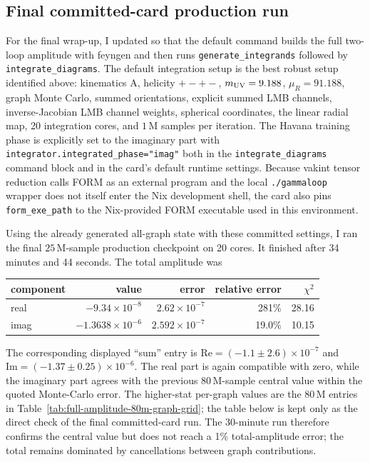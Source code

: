 \documentclass[11pt]{article}
\begin{document}
\subsection{Final committed-card production run}

For the final wrap-up, I updated
 so that the default command builds the
full two-loop amplitude with feyngen and then runs
\texttt{generate\_integrands} followed by \texttt{integrate\_diagrams}.  The
default integration setup is the best robust setup identified above:
kinematics A, helicity \(+-+-\), \(m_{\rm UV}=9.188\),
\(\mu_R=91.188\), graph Monte Carlo, summed orientations, explicit summed LMB
channels, inverse-Jacobian LMB channel weights, spherical coordinates, the
linear radial map, 20 integration cores, and \(1\,\mathrm{M}\) samples per
iteration.  The Havana training phase is explicitly set to the imaginary part
with \texttt{integrator.integrated\_phase="imag"} both in the
\texttt{integrate\_diagrams} command block and in the card's default runtime
settings.  Because vakint tensor reduction calls FORM as an external program
and the local \texttt{./gammaloop} wrapper does not itself enter the Nix
development shell, the card also pins \texttt{form\_exe\_path} to the
Nix-provided FORM executable used in this environment.

Using the already generated all-graph state with these committed settings, I
ran the final \(25\,\mathrm{M}\)-sample production checkpoint on 20 cores.  It
finished after 34 minutes and 44 seconds.  The total amplitude was
\begin{center}
\scriptsize
\begin{tabular}{lrrrr}
\toprule
component & value & error & relative error & \(\chi^2\)\\
\midrule
real & $-9.34\times10^{-8}$ & $2.62\times10^{-7}$ & 281\% & 28.16\\
imag & $-1.3638\times10^{-6}$ & $2.592\times10^{-7}$ & 19.0\% & 10.15\\
\bottomrule
\end{tabular}
\end{center}
The corresponding displayed ``sum'' entry is
\(\mathrm{Re}=(-1.1\pm2.6)\times10^{-7}\) and
\(\mathrm{Im}=(-1.37\pm0.25)\times10^{-6}\).  The real part is again
compatible with zero, while the imaginary part agrees with the previous
\(80\,\mathrm{M}\)-sample central value within the quoted Monte-Carlo error.
The higher-stat per-graph values are the \(80\,\mathrm{M}\) entries in
Table~\ref{tab:full-amplitude-80m-graph-grid}; the table below is kept only as
the direct check of the final committed-card run.
The 30-minute run therefore confirms the central value but does not reach a
1\% total-amplitude error; the total remains dominated by cancellations between
graph contributions.
\end{document}
